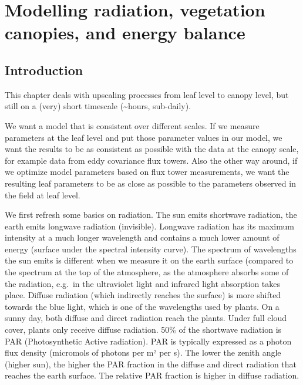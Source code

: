 \documentclass[
  12pt,
  oneside]{book}
\begin{document}
\hypertarget{modelling-radiation-vegetation-canopies-and-energy-balance}{%
\chapter{Modelling radiation, vegetation canopies, and energy balance}\label{modelling-radiation-vegetation-canopies-and-energy-balance}}


\hypertarget{introduction}{%
\section{Introduction}\label{introduction}}

This chapter deals with upscaling processes from leaf level to canopy level, but still on a (very) short timescale (\textasciitilde hours, sub-daily).

We want a model that is consistent over different scales. If we measure parameters at the leaf level and put those parameter values in our model, we want the results to be as consistent as possible with the data at the canopy scale, for example data from eddy covariance flux towers. Also the other way around, if we optimize model parameters based on flux tower measurements, we want the resulting leaf parameters to be as close as possible to the parameters observed in the field at leaf level.

We first refresh some basics on radiation. The sun emits shortwave radiation, the earth emits longwave radiation (invisible). Longwave radiation has its maximum intensity at a much longer wavelength and contains a much lower amount of energy (surface under the spectral intensity curve). The spectrum of wavelengths the sun emits is different when we measure it on the earth surface (compared to the spectrum at the top of the atmosphere, as the atmosphere absorbs some of the radiation, e.g.~in the ultraviolet light and infrared light absorption takes place. Diffuse radiation (which indirectly reaches the surface) is more shifted towards the blue light, which is one of the wavelengths used by plants. On a sunny day, both diffuse and direct radiation reach the plants. Under full cloud cover, plants only receive diffuse radiation. 50\% of the shortwave radiation is PAR (Photosynthetic Active radiation). PAR is typically expressed as a photon flux density (micromols of photons per m² per s). The lower the zenith angle (higher sun), the higher the PAR fraction in the diffuse and direct radiation that reaches the earth surface. The relative PAR fraction is higher in diffuse radiation.
\end{document}
